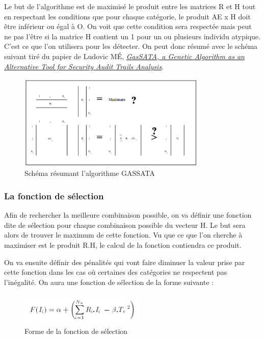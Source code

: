 \documentclass[a4paper, 11pt]{article}
\begin{document}
Le but de l'algorithme est de maximisé le produit entre les matrices R et H tout en respectant les conditions que pour chaque catégorie, le produit AE x H doit être inférieur ou égal  à O. On voit que cette condition sera respectée mais peut ne pas l'être si la matrice H contient un 1 pour un ou plusieurs individu atypique. C'est ce que l'on utilisera pour les détecter. On peut donc résumé avec le schéma suivant tiré du papier de Ludovic MÉ, \href{http://www.rennes.supelec.fr/ren/perso/lme/PUBLI/raid98.pdf}{\emph{GasSATA, a Genetic Algorithm as an Alternative Tool for Security Audit Trails Analysis}}.

\begin{figure}[h!]
\center
\includegraphics[width=9cm]{images/algoSchema.png}
\caption{Schéma résumant l'algorithme GASSATA}
\end{figure}

\subsubsection{La fonction de sélection}

Afin de rechercher la meilleure combinaison possible, on va définir une fonction dite de sélection pour chaque combinaison possible du vecteur H. Le but sera alors de trouver le maximum de cette fonction. Vu que ce que l'on cherche à maximiser est le produit R.H, le calcul de la fonction contiendra ce produit. 

On va ensuite définir des pénalités qui vont faire diminuer la valeur prise par cette fonction dans les cas où certaines des catégories ne respectent pas l'inégalité. On aura une fonction de sélection de la forme suivante : \\

\begin{figure}[h!]
\center
\includegraphics[width=6cm]{images/fonctionSelection.png}
\caption{Forme de la fonction de sélection}
\end{figure}
\end{document}

